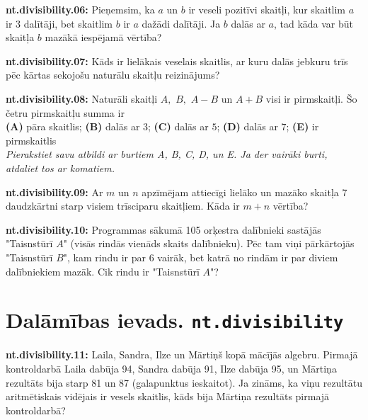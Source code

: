 \documentclass[11pt]{article}
\newenvironment{uzdevums}[1][\unskip]{%
\vspace{3mm}
\noindent
\textbf{#1:}
\noindent}
{}
\begin{document}
\begin{uzdevums}[nt.divisibility.06]
Pieņemsim, ka $a$ un $b$ ir veseli pozitīvi skaitļi, kur skaitlim $a$ ir 3 dalītāji, bet skaitlim $b$ ir $a$ dažādi dalītāji. 
Ja $b$ dalās ar $a$, tad kāda var būt skaitļa $b$ mazākā iespējamā vērtība? 
\end{uzdevums}


\begin{uzdevums}[nt.divisibility.07]
Kāds ir lielākais veselais skaitlis, ar kuru dalās jebkuru trīs pēc kārtas sekojošu naturālu skaitļu reizinājums? 
\end{uzdevums}


\begin{uzdevums}[nt.divisibility.08]
Naturāli skaitļi $A,$ $B,$ $A-B$ un $A+B$ visi ir pirmskaitļi. Šo četru pirmskaitļu summa ir\\
{\bf (A)} pāra skaitlis;\hspace{1ex} {\bf (B)} dalās ar $3$;\hspace{1ex} {\bf (C)} dalās ar $5$;\hspace{1ex} 
{\bf (D)} dalās ar $7$;\hspace{1ex} {\bf (E)} ir pirmskaitlis\\
{\em Pierakstiet savu atbildi ar burtiem A, B, C, D, un E. Ja der vairāki burti, atdaliet tos ar komatiem.}
\end{uzdevums}

\begin{uzdevums}[nt.divisibility.09]
Ar $m$ un $n$ apzīmējam attiecīgi lielāko un mazāko skaitļa 7 daudzkārtni starp visiem trīsciparu skaitļiem. 
Kāda ir $m + n$ vērtība?
\end{uzdevums}


\begin{uzdevums}[nt.divisibility.10]
Programmas sākumā 105 orķestra dalībnieki sastājās "Taisnstūrī $A$" (visās rindās vienāds skaits dalībnieku). 
Pēc tam viņi pārkārtojās "Taisnstūrī $B$", kam rindu ir par 6 vairāk, 
bet katrā no rindām ir par diviem dalībniekiem mazāk. 
Cik rindu ir "Taisnstūrī $A$"? 
\end{uzdevums}


\section{Dalāmības ievads. \texttt{nt.divisibility}}

\begin{uzdevums}[nt.divisibility.11]
Laila, Sandra, Ilze un Mārtiņš kopā mācījās algebru. Pirmajā kontroldarbā Laila dabūja 94, Sandra dabūja 91, Ilze dabūja 95, un 
Mārtiņa rezultāts bija starp 81 un 87 (galapunktus ieskaitot). Ja zināms, ka viņu rezultātu aritmētiskais 
vidējais ir vesels skaitlis, kāds bija Mārtiņa rezultāts pirmajā kontroldarbā?
\end{uzdevums}
\end{document}
